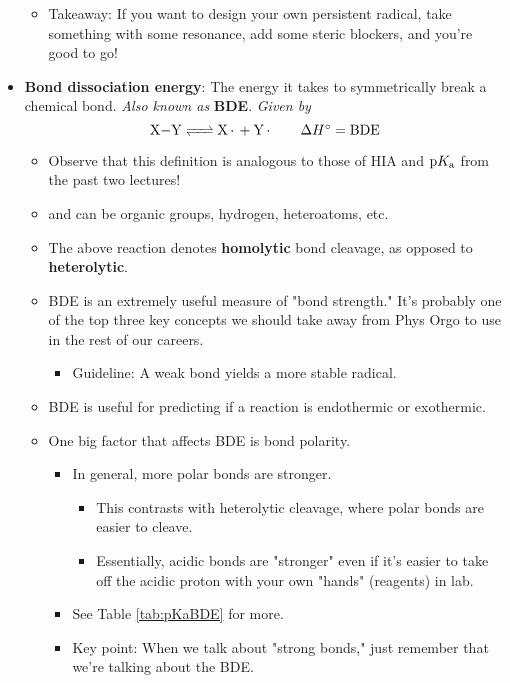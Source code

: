 \documentclass[../notes.tex]{subfiles}
\begin{document}
\begin{itemize}
\begin{itemize}
        \item Takeaway: If you want to design your own persistent radical, take something with some resonance, add some steric blockers, and you're good to go!
    \end{itemize}
    \item \textbf{Bond dissociation energy}: The energy it takes to symmetrically break a chemical bond. \emph{Also known as} \textbf{BDE}. \emph{Given by}
    \begin{equation*}
        \ce{X-Y <=> X* + Y*}\tag*{$\Delta H^\circ=\text{BDE}$}
    \end{equation*}
    \begin{itemize}
        \item Observe that this definition is analogous to those of HIA and $\textup{p}K_\textup{a}$ from the past two lectures!
        \item {} and  can be organic groups, hydrogen, heteroatoms, etc.
        \item The above reaction denotes \textbf{homolytic} bond cleavage, as opposed to \textbf{heterolytic}.
        \item BDE is an extremely useful measure of "bond strength." It's probably one of the top three key concepts we should take away from Phys Orgo to use in the rest of our careers.
        \begin{itemize}
            \item Guideline: A weak bond yields a more stable radical.
        \end{itemize}
        \item BDE is useful for predicting if a reaction is endothermic or exothermic.
        \item One big factor that affects BDE is bond polarity.
        \begin{itemize}
            \item In general, more polar bonds are stronger.
            \begin{itemize}
                \item This contrasts with heterolytic cleavage, where polar bonds are easier to cleave.
                \item Essentially, acidic bonds are "stronger" even if it's easier to take off the acidic proton with your own "hands" (reagents) in lab.
            \end{itemize}
            \item See Table \ref{tab:pKaBDE} for more.
            \item Key point: When we talk about "strong bonds," just remember that we're talking about the BDE.

\end{itemize}
\end{itemize}
\end{itemize}
\end{document}
